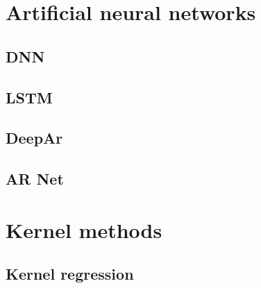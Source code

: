 \section{Artificial neural networks}
\subsection{DNN}
\subsection{LSTM}
\subsection{DeepAr}
\subsection{AR Net}

\section{Kernel methods}
\subsection{Kernel regression}
